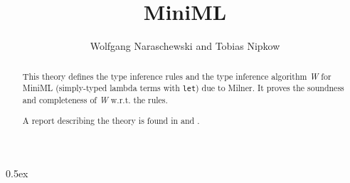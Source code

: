 \documentclass[11pt,a4paper]{article}
\begin{document}
\title{MiniML}
\author{Wolfgang Naraschewski and Tobias Nipkow}
\maketitle

\begin{abstract}
This theory defines the type inference rules and the type inference algorithm
\emph{W} for MiniML (simply-typed lambda terms with \texttt{let}) due to
Milner. It proves the soundness and completeness of \emph{W} w.r.t. the
rules.

A report describing the theory is found in \cite{Naraschewski-Nipkow-TYPES96} and \cite{NaraschewskiN-JAR}.
\end{abstract}


\parindent 0pt\parskip 0.5ex





\end{document}
